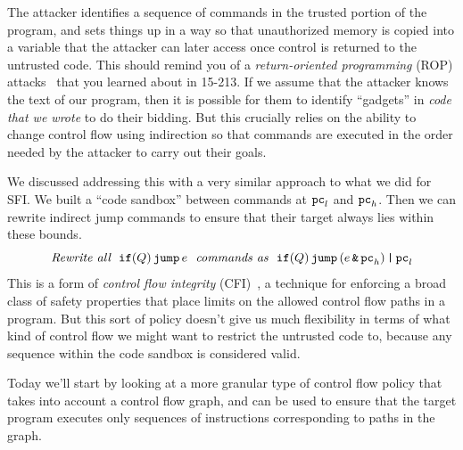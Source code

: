 \documentclass[11pt,twoside]{scrartcl}
\begin{document}
The attacker identifies a sequence of commands in the trusted portion of the program, and sets things up in a way so that unauthorized memory is copied into a variable that the attacker can later access once control is returned to the untrusted code. This should remind you of a \emph{return-oriented programming} (ROP) attacks~\cite{Hovav07} that you learned about in 15-213. If we assume that the attacker knows the text of our program, then it is possible for them to identify ``gadgets'' in \emph{code that we wrote} to do their bidding. But this crucially relies on the ability to change control flow using indirection so that commands are executed in the order needed by the attacker to carry out their goals.

We discussed addressing this with a very similar approach to what we did for SFI. We built a ``code sandbox'' between commands at $\texttt{\upshape pc}_l$ and $\texttt{\upshape pc}_h$. Then we can rewrite indirect jump commands to ensure that their target always lies within these bounds.
\begin{equation}
\textit{Rewrite all}~~\texttt{\upshape if}(Q)\,\texttt{\upshape jump}\,e~~\textit{commands as}~~\texttt{\upshape if}(Q)\,\texttt{\upshape jump}\,(e \operatorname{\texttt{\upshape \&}} \texttt{\upshape pc}_h) \operatorname{\texttt{\upshape |}} \texttt{\upshape pc}_l
\end{equation}
This is a form of \emph{control flow integrity} (CFI)~\cite{Abadi2009}, a technique for enforcing a broad class of safety properties that place limits on the allowed control flow paths in a program. But this sort of policy doesn't give us much flexibility in terms of what kind of control flow we might want to restrict the untrusted code to, because any sequence within the code sandbox is considered valid.

Today we'll start by looking at a more granular type of control flow policy that takes into account a control flow graph, and can be used to ensure that the target program executes only sequences of instructions corresponding to paths in the graph.
\end{document}
